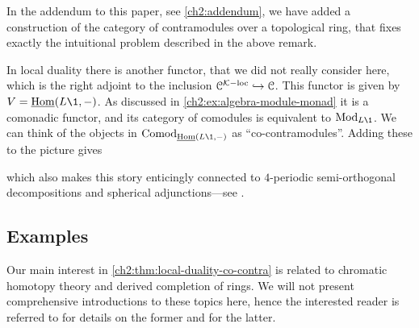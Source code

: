 \begin{addendum}
    In the addendum to this paper, see \cref{ch2:addendum}, we have added a construction of the category of contramodules over a topological ring, that fixes exactly the intuitional problem described in the above remark. 
\end{addendum}

\begin{remark}
    In local duality there is another functor, that we did not really consider here, which is the right adjoint to the inclusion $\EuScript{C}^{\mathcal{K}-\mathrm{loc}}\hookrightarrow \EuScript{C}$. This functor is given by $V = \iHom(L\1, -)$. As discussed in \cref{ch2:ex:algebra-module-monad} it is a comonadic functor, and its category of comodules is equivalent to $\Mod_{L\1}$. We can think of the objects in $\Comod_{\iHom(L\1,-)}$ as ``co-contramodules''. Adding these to the picture gives 
    \begin{center}
    \end{center}
    which also makes this story enticingly connected to $4$-periodic semi-orthogonal decompositions and spherical adjunctions---see \cite[Section 2.5]{dyckerhoff-kaparanov-schechtman-soibelman_2024}. 
\end{remark}



\subsection{Examples}

Our main interest in \cref{ch2:thm:local-duality-co-contra} is related to chromatic homotopy theory and derived completion of rings. We will not present comprehensive introductions to these topics here, hence the interested reader is referred to \cite{barthel-beaudry_19} for details on the former and \cite{barthel-heard-valenzuela_2020} for the latter.

